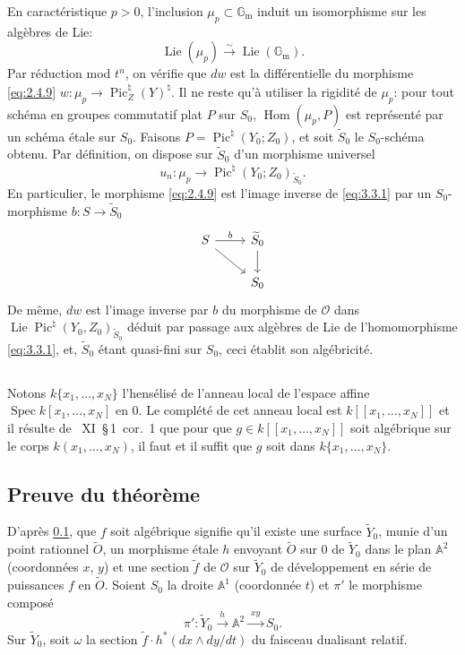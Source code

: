 \documentclass[12pt,a4paper]{article}
\theoremstyle{plain}
\theoremstyle{definition}
\theoremstyle{remark}
\DeclareMathOperator{\Spec}{Spec}
\DeclareMathOperator{\Lie}{Lie}
\DeclareMathOperator{\Pic}{Pic}
\DeclareMathOperator{\Hom}{Hom}
\newcommand{\OO}{\mathcal{O}}
\newcommand{\Gm}{\mathbb{G}_{\mathrm{m}}}
\newcommand{\mup}{\mu_{p}}
\providecommand{\AA}{\mathbb{A}}
\providecommand{\Gm}{\mathbb{G}_{\mathrm m}}
\providecommand{\Hom}{\operatorname{Hom}}
\providecommand{\Spec}{\operatorname{Spec}}
\providecommand{\mup}{\mu_p}
\providecommand{\Lie}{\operatorname{Lie}}
\begin{document}
En caractéristique $p>0$, l'inclusion $\mup\subset\Gm$ induit un isomorphisme sur les
algèbres de Lie:
\[
\Lie(\mup)\xrightarrow{\sim}\Lie(\Gm).
\]
Par réduction mod $t^n$, on vérifie que $dw$ est la différentielle du morphisme
\eqref{eq:2.4.9} $w:\mup\to\Pic_Z^\natural(Y)^\natural$. Il ne reste qu'à utiliser la rigidité de
$\mup$: pour tout schéma en groupes commutatif plat $P$ sur $S_0$, $\Hom(\mup,P)$ est
représenté par un schéma étale sur $S_0$. Faisons $P=\Pic^\natural(Y_0;Z_0)$, et soit
$\widetilde{S}_0$ le $S_0$-schéma obtenu. Par définition, on dispose sur $\widetilde{S}_0$ d'un morphisme universel
\begin{equation}\label{eq:3.3.1}
u_n:\mup\to\Pic^\natural(Y_0;Z_0)_{\widetilde{S}_0}.
\end{equation}
En particulier, le morphisme \eqref{eq:2.4.9} est l'image inverse de \eqref{eq:3.3.1} par un $S_0$-
morphisme $b:S\to\widetilde{S}_0$
\[
\begin{tikzcd}
S \ar[r,"b"] \ar[dr] & \widetilde{S}_0 \ar[d] \\
 & S_0
\end{tikzcd}
\]
De même, $dw$ est l'image inverse par $b$ du morphisme de $\OO$ dans
$\Lie\Pic^\natural(Y_0,Z_0)_{\widetilde{S}_0}$ déduit par passage aux algèbres de Lie de l'homomorphisme
\eqref{eq:3.3.1}, et, $\widetilde{S}_0$ étant quasi-fini sur $S_0$, ceci établit son algébricité.

\subsection{}\label{sec:3.4}

Notons $k\{x_1,\dots,x_N\}$ l'hensélisé de l'anneau local de l'espace affine
$\Spec k[x_1,\dots,x_N]$ en $0$. Le complété de cet anneau local est $k[[x_1,\dots,x_N]]$
et il résulte de \cite{Raynaud2}~XI~\S\,1~cor.~1 que pour que
$g\in k[[x_1,\dots,x_N]]$ soit algébrique sur le corps $k(x_1,\dots,x_N)$, il faut et
il suffit que $g$ soit dans $k\{x_1,\dots,x_N\}$.

\subsection{Preuve du théorème}\label{sec:3.5}

D'après \ref{sec:3.4}, que $f$ soit algébrique signifie qu'il existe une surface
$\widetilde{Y}_0$, munie d'un point rationnel $\widetilde{O}$, un morphisme étale $h$ envoyant
$\widetilde{O}$ sur $0$ de $\widetilde{Y}_0$ dans le plan $\AA^2$ (coordonnées $x$, $y$) et une section
$\tilde{f}$ de $\OO$ sur $\widetilde{Y}_0$ de développement en série de puissances $f$ en $\widetilde{O}$.
Soient $S_0$ la droite $\AA^1$ (coordonnée $t$) et $\pi'$ le morphisme composé
\[
\pi':\widetilde{Y}_0\xrightarrow{\;h\;}\AA^2\xrightarrow{\;xy\;}S_0.
\]
Sur $\widetilde{Y}_0$, soit $\omega$ la section $\tilde{f}\cdot h^*(dx\wedge dy/dt)$ du faisceau dualisant relatif.
\end{document}
